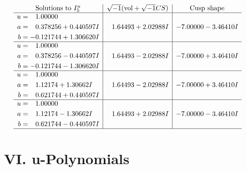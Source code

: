 \documentclass[1p]{elsarticle_modified}
\theoremstyle{definition}
\newcommand{\I}{\sqrt{-1}}
\begin{document}
$$\begin{array}{c|c|c}  
\text{Solutions to }I^u_{5}& \I (\text{vol} + \sqrt{-1}CS) & \text{Cusp shape}\\
 \hline 
\begin{aligned}
u &= \phantom{-}1.00000\phantom{ +0.000000I} \\
a &= \phantom{-}0.378256 + 0.440597 I \\
b &= -0.121744 + 1.306620 I\end{aligned}
 & \phantom{-}1.64493 + 2.02988 I & -7.00000 - 3.46410 I \\ \hline\begin{aligned}
u &= \phantom{-}1.00000\phantom{ +0.000000I} \\
a &= \phantom{-}0.378256 - 0.440597 I \\
b &= -0.121744 - 1.306620 I\end{aligned}
 & \phantom{-}1.64493 - 2.02988 I & -7.00000 + 3.46410 I \\ \hline\begin{aligned}
u &= \phantom{-}1.00000\phantom{ +0.000000I} \\
a &= \phantom{-}1.12174 + 1.30662 I \\
b &= \phantom{-}0.621744 + 0.440597 I\end{aligned}
 & \phantom{-}1.64493 - 2.02988 I & -7.00000 + 3.46410 I \\ \hline\begin{aligned}
u &= \phantom{-}1.00000\phantom{ +0.000000I} \\
a &= \phantom{-}1.12174 - 1.30662 I \\
b &= \phantom{-}0.621744 - 0.440597 I\end{aligned}
 & \phantom{-}1.64493 + 2.02988 I & -7.00000 - 3.46410 I\\
 \hline 
 \end{array}$$\newpage
\newpage\renewcommand{\arraystretch}{1}
\centering \section*{ VI. u-Polynomials}
\end{document}
